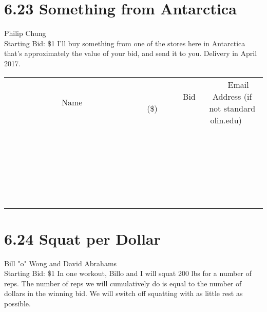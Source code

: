 \documentclass[11pt]{article}
\begin{document}
\section*{6.23 Something from Antarctica}
Philip Chung
\\
Starting Bid: \$1
\newline
I'll buy something from one of the stores here in Antarctica that's approximately the value of your bid, and send it to you. Delivery in April 2017.
\\[6ex]
\begin{tabular}{c c c}
~~~~~~~~~~~~~Name~~~~~~~~~~~~~ & ~~~~~~~~~Bid (\$)~~~~~~~~~  & ~~~Email Address (if not standard olin.edu)~~~\\
 & & \\
\hline
 & & \\
\hline
 & & \\
\hline
 & & \\
\hline
 & & \\
\hline
 & & \\
\hline
 & & \\
\hline
 & & \\
\hline
 & & \\
\hline
 & & \\
\hline
 & & \\
\hline
 & & \\
\hline
 & & \\
\hline
 & & \\
\hline
 & & \\
\hline
 & & \\
\hline
 & & \\
\hline
 & & \\
\hline
 & & \\
\hline
 & & \\
\hline
 & & \\
\hline
 & & \\
\hline
 & & \\
\hline
 & & \\
\hline
 & & \\
\hline
 & & \\
\hline
\end{tabular}
\newpage
\section*{6.24 Squat per Dollar}
Bill "o" Wong and David Abrahams
\\
Starting Bid: \$1
\newline
In one workout, Billo and I will squat 200 lbs for a number of reps. The number of reps we will cumulatively do is equal to the number of dollars in the winning bid. We will switch off squatting with as little rest as possible.
\end{document}
